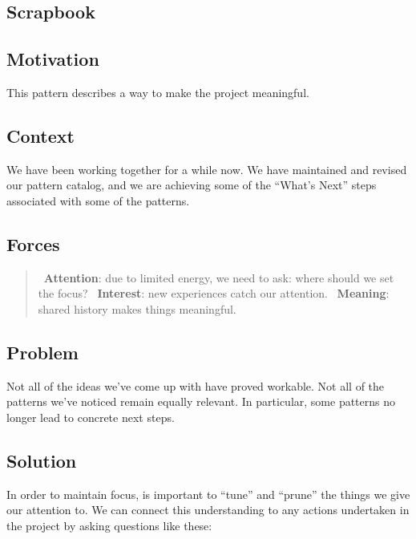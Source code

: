 \hypertarget{scrapbook}{%
\subsection{Scrapbook}\label{scrapbook}}

\hypertarget{motivation}{%
\subsection{Motivation}\label{motivation}}

This pattern describes a way to make the project meaningful.

\hypertarget{context}{%
\subsection{Context}\label{context}}

We have been working together for a while now. We have maintained and
revised our pattern catalog, and we are achieving some of the ``What's
Next'' steps associated with some of the patterns.

\hypertarget{forces}{%
\subsection{Forces}\label{forces}}

\begin{quote}
\Sattention\ \textbf{Attention}: due to limited energy, we need to ask: where should we set the focus?
\Sinterest\ \textbf{Interest}: new experiences catch our attention.
\Smeaning\ \textbf{Meaning}: shared history makes things meaningful.
\end{quote}

\hypertarget{problem}{%
\subsection{Problem}\label{problem}}

Not all of the ideas we've come up with have proved workable. Not all of
the patterns we've noticed remain equally relevant. In particular, some
patterns no longer lead to concrete next steps.

\hypertarget{solution}{%
\subsection{Solution}\label{solution}}

In order to maintain focus, is important to ``tune'' and ``prune'' the
things we give our attention to. We can connect this understanding to
any actions undertaken in the project by asking questions like these:

